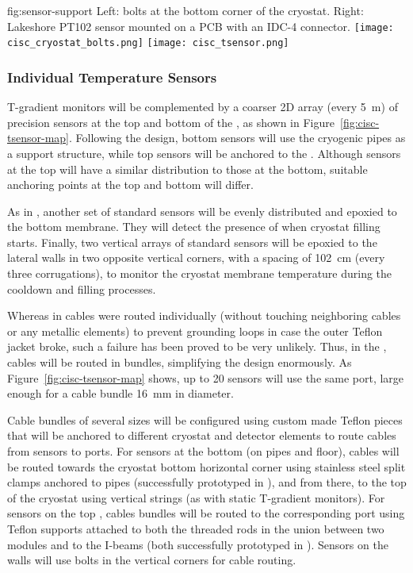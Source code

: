 \begin{dunefigure}{fig:sensor-support}
  {Left: bolts at the bottom corner of the cryostat. Right: Lakeshore PT102 sensor mounted on a PCB with an IDC-4 connector.}
  \texttt{[image: cisc\_cryostat\_bolts.png]}%
    \hspace{1cm}%
  \texttt{[image: cisc\_tsensor.png]}%
\end{dunefigure}


\subsubsection{Individual Temperature Sensors}
\label{sec:fdgen-slow-cryo-individual-therm}

T-gradient monitors will be complemented by a coarser 2D array (every \SI{5}{m}) of precision sensors at the top and bottom of the , as shown in Figure~\ref{fig:cisc-tsensor-map}. Following the  design, bottom sensors will use the cryogenic pipes as a support structure, while top sensors will be anchored to the . Although sensors at the top will have a similar distribution to those at the bottom, %
suitable anchoring points at the top and bottom will differ. 

As in , another set of standard sensors will be evenly distributed and epoxied to the bottom membrane. They will detect the presence of  when cryostat filling starts. Finally, two vertical arrays of standard sensors will be epoxied to the lateral walls in two opposite vertical corners, with a spacing of \SI{102}{cm} (every three corrugations), to monitor the cryostat membrane temperature during the cooldown and filling processes. 

Whereas in  cables were routed individually (without touching neighboring cables or any metallic elements) to prevent grounding loops in case the outer Teflon jacket broke, such a failure has been proved to be very unlikely. Thus, in the , cables will be routed in bundles, simplifying the design enormously. As Figure~\ref{fig:cisc-tsensor-map} shows, up to 20 sensors will use the same  port, large enough for a cable bundle \SI{16}{mm} in diameter.

Cable bundles of several sizes will be configured using custom made Teflon 
pieces %
that will be anchored to different cryostat and detector elements to route cables from sensors to  ports. For sensors at the bottom (on pipes and floor), cables will be routed towards the cryostat bottom horizontal corner using stainless steel split clamps anchored to pipes (successfully prototyped in ), and from there, to the top of the cryostat using vertical strings (as with static T-gradient monitors). For sensors on the top , cables bundles will be routed to the corresponding  port using Teflon supports attached to both the \frfour threaded rods in the union between two  modules and to the  I-beams (both successfully prototyped in ). Sensors on the walls will use bolts in the vertical corners for cable routing. 

